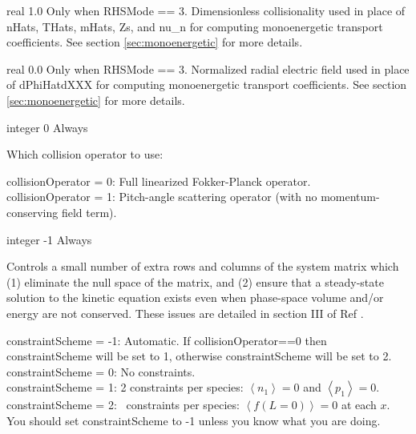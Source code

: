 \myhrule

{real}
{1.0}
{Only when {\ttfamily RHSMode} == 3.}
{Dimensionless collisionality used in place of {\ttfamily nHats}, {\ttfamily THats}, {\ttfamily mHats}, {\ttfamily Zs}, and {\ttfamily nu\_n} for computing monoenergetic transport coefficients.
See section \ref{sec:monoenergetic} for more details.}

\myhrule

{real}
{0.0}
{Only when {\ttfamily RHSMode} == 3.}
{Normalized radial electric field used in place of {\ttfamily dPhiHatdXXX} for computing monoenergetic transport coefficients.
See section \ref{sec:monoenergetic} for more details.}


\myhrule

{integer}
{0}
{Always}
{Which collision operator to use:\\

{\setlength{\parindent}{0cm}

{\ttfamily collisionOperator} = 0: Full linearized Fokker-Planck operator.\\

{\ttfamily collisionOperator} = 1: Pitch-angle scattering operator (with no momentum-conserving field term).
}}

\myhrule

{integer}
{-1}
{Always}
{Controls a small number of extra rows and columns of the system matrix
which (1) eliminate the null space of the matrix, and (2) ensure that a steady-state solution
to the kinetic equation exists even when phase-space volume and/or energy are not conserved.
These issues are detailed in section III of Ref \cite{sfincsPaper}.
\\

{\setlength{\parindent}{0cm}

{\ttfamily constraintScheme} = -1: Automatic. If {\ttfamily collisionOperator}==0 then {\ttfamily constraintScheme} will be set to 1, 
otherwise {\ttfamily constraintScheme} will be set to 2.\\

{\ttfamily constraintScheme} = 0: No constraints.\\

{\ttfamily constraintScheme} = 1: 2 constraints per species: $\left<n_1\right>=0$ and $\left<p_1\right>=0$.\\

{\ttfamily constraintScheme} = 2: \Nx~constraints per species: $\left< f(L=0)\right>=0$ at each $x$.\\

You should set {\ttfamily constraintScheme} to -1 unless you know what you are doing.
}}

